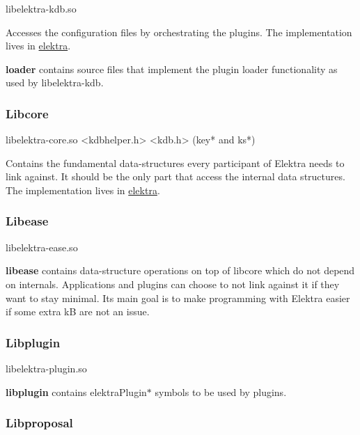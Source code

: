 \begin{DoxyVerb}libelektra-kdb.so
\end{DoxyVerb}


Accesses the configuration files by orchestrating the plugins. The implementation lives in \hyperlink{md_src_libs_elektra_README_src_libs_elektra_README_md}{elektra}.

{\bfseries loader} contains source files that implement the plugin loader functionality as used by {\ttfamily libelektra-\/kdb}.

\subsubsection*{Libcore}

\begin{DoxyVerb}libelektra-core.so
<kdbhelper.h>
<kdb.h> (key* and ks*)
\end{DoxyVerb}


Contains the fundamental data-\/structures every participant of Elektra needs to link against. It should be the only part that access the internal data structures. The implementation lives in \hyperlink{md_src_libs_elektra_README_src_libs_elektra_README_md}{elektra}.

\subsubsection*{Libease}

\begin{DoxyVerb}libelektra-ease.so
\end{DoxyVerb}


{\bfseries libease} contains data-\/structure operations on top of libcore which do not depend on internals. Applications and plugins can choose to not link against it if they want to stay minimal. Its main goal is to make programming with Elektra easier if some extra kB are not an issue.

\subsubsection*{Libplugin}

\begin{DoxyVerb}libelektra-plugin.so
\end{DoxyVerb}


{\bfseries libplugin} contains {\ttfamily elektra\+Plugin$\ast$} symbols to be used by plugins.

\subsubsection*{Libproposal}

